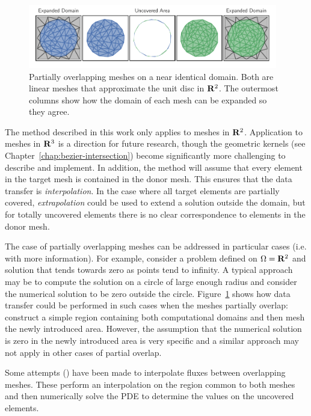 \begin{figure}
  \includegraphics[width=0.96875\textwidth]
                  {../images/curved-mesh/main_figure29.pdf}
  \centering
  \captionsetup{width=.75\linewidth}
  \caption{Partially overlapping meshes on a near identical domain. Both are
    linear meshes that approximate the unit disc in \(\mathbf{R}^2\). The outermost
    columns show how the domain of each mesh can be expanded so they agree.}
  \label{fig:partially-overlapping}
\end{figure}

The method described in this work only applies to meshes in \(\mathbf{R}^2\).
Application to meshes in \(\mathbf{R}^3\) is a direction for future research,
though the geometric kernels (see Chapter~\ref{chap:bezier-intersection})
become significantly more challenging to describe and implement. In
addition, the method will assume that every element in the
target mesh is contained in the donor mesh. This ensures that the data
transfer is \textit{interpolation}. In the case where all target elements are
partially covered, \textit{extrapolation} could be used to extend a solution
outside the domain, but for totally uncovered elements there is no clear
correspondence to elements in the donor mesh.

The case of partially overlapping meshes can be addressed in particular
cases (i.e. with more information). For example, consider a problem
defined on \(\Omega = \mathbf{R}^2\) and solution
that tends towards zero as points tend to infinity. A typical approach
may be to compute the solution on a circle of large enough radius and
consider the numerical solution to be zero outside the circle.
Figure~\ref{fig:partially-overlapping} shows how data transfer could be
performed in such cases when the meshes partially overlap: construct a
simple region containing both computational domains and then mesh the
newly introduced area. However, the assumption that the numerical solution
is zero in the newly introduced area is very specific and
a similar approach may not apply in other cases of partial overlap.

Some attempts (\cite{Berger1987, Chesshire1994, Cai1999}) have been
made to interpolate fluxes between overlapping meshes. These perform
an interpolation on the region common to both meshes and then numerically
solve the PDE to determine the values on the uncovered elements.

